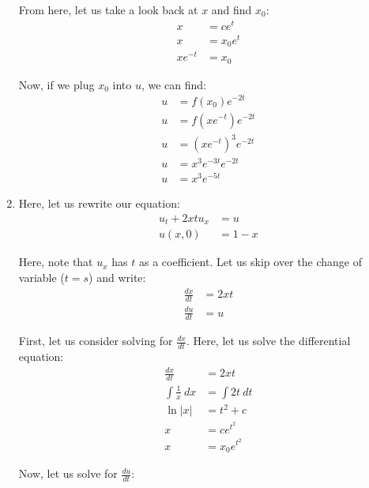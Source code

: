 \begin{enumerate}
  From here, let us take a look back at $x$ and find $x_0$:
  \begin{align}
    x & = ce^t\\
    x & = x_0 e^t\\
    x e^{-t} & = x_0
  \end{align}

  Now, if we plug $x_0$ into $u$, we can find:
  \begin{align}
    u & = f\left( x_0 \right) e^{-2t}\\
    u & = f\left( x e^{-t} \right) e^{-2t}\\
    u & = \left(x e^{-t}\right)^3 e^{-2t}\\
    u & = x^3 e^{-3t} e^{-2t}\\
    u & = x^3 e^{-5t}
  \end{align}

  \item Here, let us rewrite our equation:
  \begin{align}
    u_t + 2x tu_x & = u\\
    u(x, 0) & = 1 - x
  \end{align}

  Here, note that $u_x$ has $t$ as a coefficient. Let us skip over the change of variable ($t = s$) and write:
  \begin{align}
    \frac{dx}{dt} & = 2xt\\
    \frac{du}{dt} & = u
  \end{align}

  First, let us consider solving for $\frac{dx}{dt}$.
  Here, let us solve the differential equation:
  \begin{align}
    \frac{dx}{dt} & = 2xt\\
    \int \frac{1}{x}\ dx & = \int 2t\ dt\\
    \ln |x| & = t^2 + c\\
    x & = ce^{t^2}\\
    x & = x_0 e^{t^2}
  \end{align}

  Now, let us solve for $\frac{du}{dt}$:
  \begin{align}

  \end{align}
\end{enumerate}
